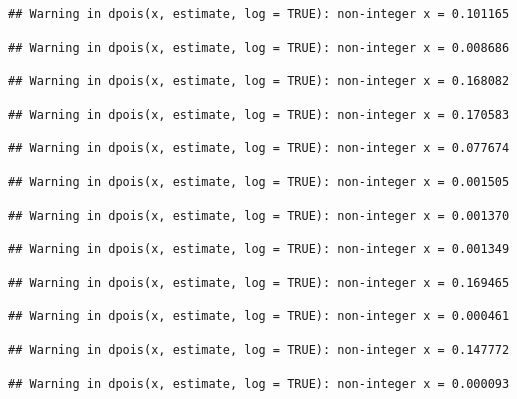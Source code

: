 \documentclass[]{article}
\begin{document}
\begin{verbatim}
## Warning in dpois(x, estimate, log = TRUE): non-integer x = 0.101165
\end{verbatim}

\begin{verbatim}
## Warning in dpois(x, estimate, log = TRUE): non-integer x = 0.008686
\end{verbatim}

\begin{verbatim}
## Warning in dpois(x, estimate, log = TRUE): non-integer x = 0.168082
\end{verbatim}

\begin{verbatim}
## Warning in dpois(x, estimate, log = TRUE): non-integer x = 0.170583
\end{verbatim}

\begin{verbatim}
## Warning in dpois(x, estimate, log = TRUE): non-integer x = 0.077674
\end{verbatim}

\begin{verbatim}
## Warning in dpois(x, estimate, log = TRUE): non-integer x = 0.001505
\end{verbatim}

\begin{verbatim}
## Warning in dpois(x, estimate, log = TRUE): non-integer x = 0.001370
\end{verbatim}

\begin{verbatim}
## Warning in dpois(x, estimate, log = TRUE): non-integer x = 0.001349
\end{verbatim}

\begin{verbatim}
## Warning in dpois(x, estimate, log = TRUE): non-integer x = 0.169465
\end{verbatim}

\begin{verbatim}
## Warning in dpois(x, estimate, log = TRUE): non-integer x = 0.000461
\end{verbatim}

\begin{verbatim}
## Warning in dpois(x, estimate, log = TRUE): non-integer x = 0.147772
\end{verbatim}

\begin{verbatim}
## Warning in dpois(x, estimate, log = TRUE): non-integer x = 0.000093
\end{verbatim}
\end{document}
